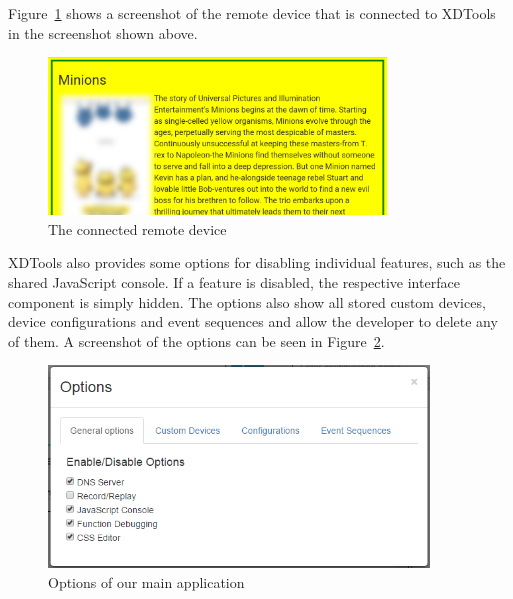 Figure~\ref{fig:complete_remote} shows a screenshot of the remote device that is connected to XDTools in the screenshot shown above.

\begin{figure}[H]
  \centering
    \includegraphics[width=0.8\textwidth]{images/screenshots/complete_remote_2.png}
	\caption[Screenshot: Remote Device]{The connected remote device}
	\label{fig:complete_remote}
\end{figure}

XDTools also provides some options for disabling individual features, such as the shared JavaScript console. If a feature is disabled, the respective interface component is simply hidden. The options also show all stored custom devices, device configurations and event sequences and allow the developer to delete any of them. A screenshot of the options can be seen in Figure~\ref{fig:options}.

\begin{figure}[H]
  \centering
    \includegraphics[width=0.9\textwidth]{images/screenshots/options.png}
	\caption[Screenshot: Options]{Options of our main application}
	\label{fig:options}
\end{figure}

